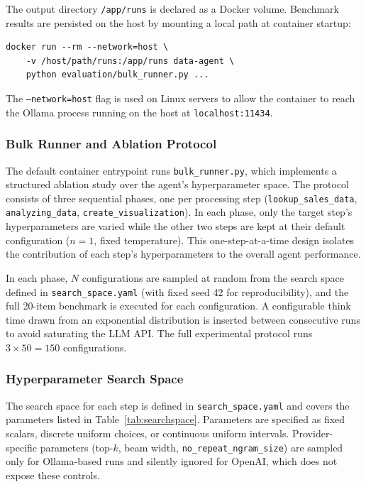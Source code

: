 \documentclass[11pt,a4paper]{article}
\begin{document}
The output directory \texttt{/app/runs} is declared as a Docker volume. Benchmark
results are persisted on the host by mounting a local path at container startup:

\begin{verbatim}
docker run --rm --network=host \
    -v /host/path/runs:/app/runs data-agent \
    python evaluation/bulk_runner.py ...
\end{verbatim}

The \texttt{--network=host} flag is used on Linux servers to allow the container
to reach the Ollama process running on the host at \texttt{localhost:11434}.

\subsubsection{Bulk Runner and Ablation Protocol}

The default container entrypoint runs \texttt{bulk\_runner.py}, which implements a
structured ablation study over the agent's hyperparameter space. The protocol
consists of three sequential phases, one per processing step
(\texttt{lookup\_sales\_data}, \texttt{analyzing\_data},
\texttt{create\_visualization}). In each phase, only the target step's
hyperparameters are varied while the other two steps are kept at their default
configuration ($n=1$, fixed temperature). This one-step-at-a-time design isolates
the contribution of each step's hyperparameters to the overall agent performance.

In each phase, $N$ configurations are sampled at random from the search space
defined in \texttt{search\_space.yaml} (with fixed seed 42 for reproducibility),
and the full 20-item benchmark is executed for each configuration. A configurable
think time drawn from an exponential distribution is inserted between consecutive
runs to avoid saturating the LLM API. The full experimental protocol runs
$3 \times 50 = 150$ configurations.

\subsubsection{Hyperparameter Search Space}

The search space for each step is defined in \texttt{search\_space.yaml} and
covers the parameters listed in Table~\ref{tab:searchspace}. Parameters are
specified as fixed scalars, discrete uniform choices, or continuous uniform
intervals. Provider-specific parameters (top-$k$, beam width,
\texttt{no\_repeat\_ngram\_size}) are sampled only for Ollama-based runs and
silently ignored for OpenAI, which does not expose these controls.
\end{document}
